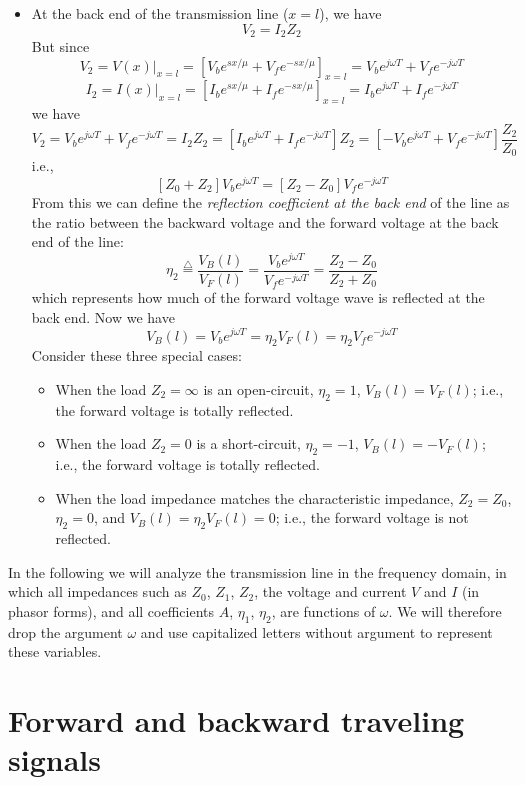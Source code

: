 \begin{itemize}
\item At the back end of the transmission line ($x=l$), we have
  \[	V_2=I_2Z_2	\]
  But since
  \[ V_2=V(x)|_{x=l}=[V_be^{sx/\mu}+V_fe^{-sx/\mu}]_{x=l}
  =V_be^{j\omega T}+V_fe^{-j\omega T}	\]
  \[ I_2=I(x)|_{x=l}=[I_be^{sx/\mu}+I_fe^{-sx/\mu}]_{x=l}
  =I_be^{j\omega T}+I_fe^{-j\omega T}	\]
  we have
  \[ V_2=V_be^{j\omega T}+V_fe^{-j\omega T}=I_2Z_2=[I_be^{j\omega T}+I_fe^{-j\omega T}]Z_2
  =[-V_be^{j\omega T}+V_fe^{-j\omega T}]\frac{Z_2}{Z_0} \]
  i.e.,
  \[ [Z_0+Z_2]V_be^{j\omega T}=[Z_2-Z_0]V_fe^{-j\omega T} \]
  From this we can define the {\em reflection coefficient at the back end}
  of the line as the ratio between the backward voltage and the forward voltage 
  at the back end of the line:
  \[	\eta_2\stackrel{\triangle}{=}\frac{V_B(l)}{V_F(l)}
  =\frac{V_be^{j\omega T}}{V_fe^{-j\omega T}}=\frac{Z_2-Z_0}{Z_2+Z_0}	\]
  which represents how much of the forward voltage wave is reflected at 
  the back end. Now we have
  \[ V_B(l)=V_b e^{j\omega T}=\eta_2 V_F(l)=\eta_2 V_f e^{-j\omega T}  \]
  Consider these three special cases:
  \begin{itemize}
  \item When the load $Z_2=\infty$ is an open-circuit, $\eta_2=1$,
    $V_B(l)=V_F(l)$; i.e., the forward voltage is totally reflected.
  \item When the load $Z_2=0$ is a short-circuit, $\eta_2=-1$, 
    $V_B(l)=-V_F(l)$; i.e., the forward voltage is totally reflected.
  \item When the load impedance matches the characteristic impedance, 
    $Z_2=Z_0$, $\eta_2=0$, and $V_B(l)=\eta_2 V_F(l)=0$; i.e., the forward 
    voltage is not reflected.
  \end{itemize}

\end{itemize}
In the following we will analyze the transmission line in the frequency
domain, in which all impedances such as $Z_0$, $Z_1$, $Z_2$, the voltage 
and current $V$ and $I$ (in phasor forms), and all coefficients $A$, 
$\eta_1$, $\eta_2$, are functions of $\omega$. We will therefore drop 
the argument $\omega$ and use capitalized letters without argument to 
represent these variables.


\section*{Forward and backward traveling signals}

